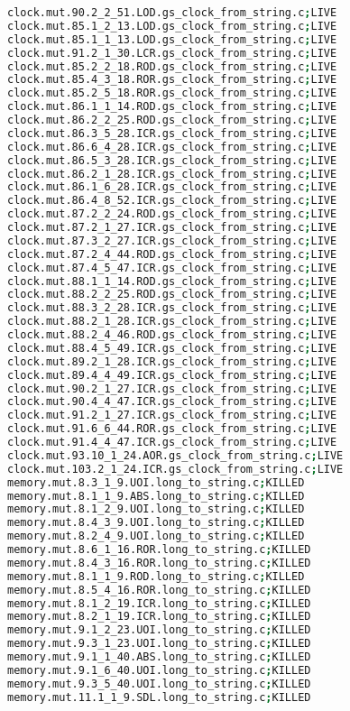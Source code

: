 \begin{lstlisting}[language=bash, label=statuses, caption=Mutants statuses.]
clock.mut.90.2_2_51.LOD.gs_clock_from_string.c;LIVE
clock.mut.85.1_2_13.LOD.gs_clock_from_string.c;LIVE
clock.mut.85.1_1_13.LOD.gs_clock_from_string.c;LIVE
clock.mut.91.2_1_30.LCR.gs_clock_from_string.c;LIVE
clock.mut.85.2_2_18.ROD.gs_clock_from_string.c;LIVE
clock.mut.85.4_3_18.ROR.gs_clock_from_string.c;LIVE
clock.mut.85.2_5_18.ROR.gs_clock_from_string.c;LIVE
clock.mut.86.1_1_14.ROD.gs_clock_from_string.c;LIVE
clock.mut.86.2_2_25.ROD.gs_clock_from_string.c;LIVE
clock.mut.86.3_5_28.ICR.gs_clock_from_string.c;LIVE
clock.mut.86.6_4_28.ICR.gs_clock_from_string.c;LIVE
clock.mut.86.5_3_28.ICR.gs_clock_from_string.c;LIVE
clock.mut.86.2_1_28.ICR.gs_clock_from_string.c;LIVE
clock.mut.86.1_6_28.ICR.gs_clock_from_string.c;LIVE
clock.mut.86.4_8_52.ICR.gs_clock_from_string.c;LIVE
clock.mut.87.2_2_24.ROD.gs_clock_from_string.c;LIVE
clock.mut.87.2_1_27.ICR.gs_clock_from_string.c;LIVE
clock.mut.87.3_2_27.ICR.gs_clock_from_string.c;LIVE
clock.mut.87.2_4_44.ROD.gs_clock_from_string.c;LIVE
clock.mut.87.4_5_47.ICR.gs_clock_from_string.c;LIVE
clock.mut.88.1_1_14.ROD.gs_clock_from_string.c;LIVE
clock.mut.88.2_2_25.ROD.gs_clock_from_string.c;LIVE
clock.mut.88.3_2_28.ICR.gs_clock_from_string.c;LIVE
clock.mut.88.2_1_28.ICR.gs_clock_from_string.c;LIVE
clock.mut.88.2_4_46.ROD.gs_clock_from_string.c;LIVE
clock.mut.88.4_5_49.ICR.gs_clock_from_string.c;LIVE
clock.mut.89.2_1_28.ICR.gs_clock_from_string.c;LIVE
clock.mut.89.4_4_49.ICR.gs_clock_from_string.c;LIVE
clock.mut.90.2_1_27.ICR.gs_clock_from_string.c;LIVE
clock.mut.90.4_4_47.ICR.gs_clock_from_string.c;LIVE
clock.mut.91.2_1_27.ICR.gs_clock_from_string.c;LIVE
clock.mut.91.6_6_44.ROR.gs_clock_from_string.c;LIVE
clock.mut.91.4_4_47.ICR.gs_clock_from_string.c;LIVE
clock.mut.93.10_1_24.AOR.gs_clock_from_string.c;LIVE
clock.mut.103.2_1_24.ICR.gs_clock_from_string.c;LIVE
memory.mut.8.3_1_9.UOI.long_to_string.c;KILLED
memory.mut.8.1_1_9.ABS.long_to_string.c;KILLED
memory.mut.8.1_2_9.UOI.long_to_string.c;KILLED
memory.mut.8.4_3_9.UOI.long_to_string.c;KILLED
memory.mut.8.2_4_9.UOI.long_to_string.c;KILLED
memory.mut.8.6_1_16.ROR.long_to_string.c;KILLED
memory.mut.8.4_3_16.ROR.long_to_string.c;KILLED
memory.mut.8.1_1_9.ROD.long_to_string.c;KILLED
memory.mut.8.5_4_16.ROR.long_to_string.c;KILLED
memory.mut.8.1_2_19.ICR.long_to_string.c;KILLED
memory.mut.8.2_1_19.ICR.long_to_string.c;KILLED
memory.mut.9.1_2_23.UOI.long_to_string.c;KILLED
memory.mut.9.3_1_23.UOI.long_to_string.c;KILLED
memory.mut.9.1_1_40.ABS.long_to_string.c;KILLED
memory.mut.9.1_6_40.UOI.long_to_string.c;KILLED
memory.mut.9.3_5_40.UOI.long_to_string.c;KILLED
memory.mut.11.1_1_9.SDL.long_to_string.c;KILLED

\end{lstlisting}
